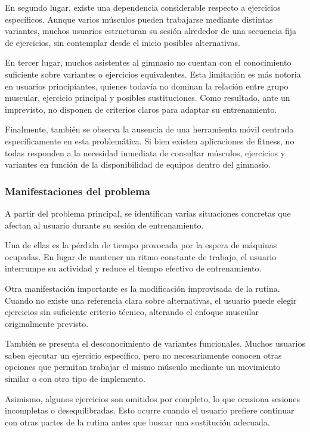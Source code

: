 En segundo lugar, existe una dependencia considerable respecto a ejercicios específicos. Aunque varios músculos pueden trabajarse mediante distintas variantes, muchos usuarios estructuran su sesión alrededor de una secuencia fija de ejercicios, sin contemplar desde el inicio posibles alternativas.

En tercer lugar, muchos asistentes al gimnasio no cuentan con el conocimiento suficiente sobre variantes o ejercicios equivalentes. Esta limitación es más notoria en usuarios principiantes, quienes todavía no dominan la relación entre grupo muscular, ejercicio principal y posibles sustituciones. Como resultado, ante un imprevisto, no disponen de criterios claros para adaptar su entrenamiento.

Finalmente, también se observa la ausencia de una herramienta móvil centrada específicamente en esta problemática. Si bien existen aplicaciones de fitness, no todas responden a la necesidad inmediata de consultar músculos, ejercicios y variantes en función de la disponibilidad de equipos dentro del gimnasio.

\subsubsection{Manifestaciones del problema}

A partir del problema principal, se identifican varias situaciones concretas que afectan al usuario durante su sesión de entrenamiento.

Una de ellas es la pérdida de tiempo provocada por la espera de máquinas ocupadas. En lugar de mantener un ritmo constante de trabajo, el usuario interrumpe su actividad y reduce el tiempo efectivo de entrenamiento.

Otra manifestación importante es la modificación improvisada de la rutina. Cuando no existe una referencia clara sobre alternativas, el usuario puede elegir ejercicios sin suficiente criterio técnico, alterando el enfoque muscular originalmente previsto.

También se presenta el desconocimiento de variantes funcionales. Muchos usuarios saben ejecutar un ejercicio específico, pero no necesariamente conocen otras opciones que permitan trabajar el mismo músculo mediante un movimiento similar o con otro tipo de implemento.

Asimismo, algunos ejercicios son omitidos por completo, lo que ocasiona sesiones incompletas o desequilibradas. Esto ocurre cuando el usuario prefiere continuar con otras partes de la rutina antes que buscar una sustitución adecuada.

